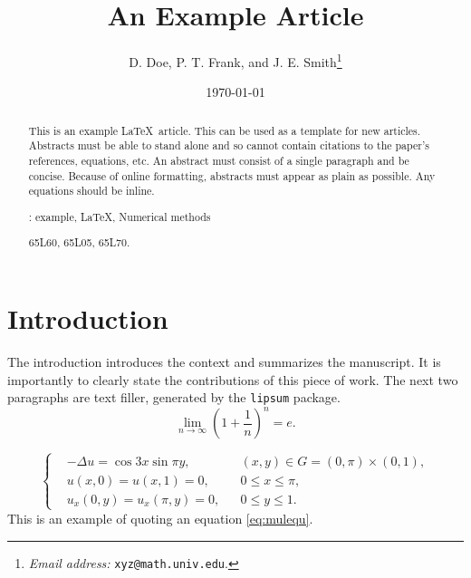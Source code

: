 \documentclass[10pt,reqno,final]{article}
\title{An Example Article}
\author{D. Doe, P. T. Frank, and J. E. Smith\thanks{{\it Email address:} \texttt{xyz@math.univ.edu}.} }
\date{\today}
\theoremstyle{plain}
\theoremstyle{definition}
\theoremstyle{remark}
\begin{document}
\maketitle

\begin{abstract}
  This is an example \LaTeX\ article. This can be used as a
  template for new articles.  Abstracts must be able to stand alone
  and so cannot contain citations to the paper's references,
  equations, etc.  An abstract must consist of a single paragraph and
  be concise. Because of online formatting, abstracts must appear as
  plain as possible. Any equations should be inline.

  \medskip
  : example, \LaTeX, Numerical methods

  \medskip
   65L60, 65L05, 65L70.
\end{abstract}


\section{Introduction}
The introduction introduces the context and summarizes the
manuscript. It is importantly to clearly state the contributions of
this piece of work. The next two paragraphs are text filler,
generated by the \texttt{lipsum} package.
\begin{equation}\label{eq:limite}
  \lim_{n\to\infty}\left(1+\frac{1}{n}\right)^n=e.
\end{equation}

\lipsum[2]

\begin{equation}\label{eq:mulequ}
\left\{\begin{aligned}
&-\Delta u=\cos 3x \sin \pi y, && (x, y) \in G=(0, \pi) \times(0,1), \\
&u(x, 0)=u(x, 1)=0, && 0 \leqslant x \leqslant \pi, \\
&u_{x}(0, y)=u_{x}(\pi, y)=0, && 0 \leqslant y \leqslant 1.
\end{aligned}\right.
\end{equation}
This is an example of quoting an equation \eqref{eq:mulequ}.

\end{document}
